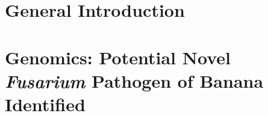 \documentclass[11pt, a4paper]{report}  %
\begin{document}
\clearpage

\setcounter{secnumdepth}{2}

      
\renewcommand{\arraystretch}{1.5} %

    
\chapter{General Introduction}\label{Chap1}
    
    
\chapter{Genomics: Potential Novel \textit{Fusarium} Pathogen of Banana Identified}\label{Chap2}
    
    
%     
    
%     
    
%     


\end{document}
